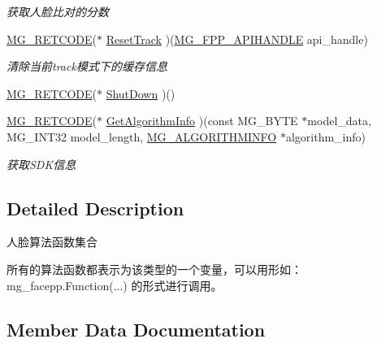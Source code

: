 \begin{DoxyCompactItemize}
\begin{DoxyCompactList}\small\item\em 获取人脸比对的分数 \end{DoxyCompactList}\item 
\hyperlink{_m_g___common_8h_a38fecb61b8c39592ddb51f75d4a5c5e7}{M\+G\+\_\+\+R\+E\+T\+C\+O\+DE}($\ast$ \hyperlink{struct_m_g___f_a_c_e_p_p___a_p_i___f_u_n_c_t_i_o_n_s___t_y_p_e_a53c43385e1f5bcc26e8125a382c2a167}{Reset\+Track} )(\hyperlink{_m_g___facepp_8h_ada15f635ef909e9aca52824dd580da40}{M\+G\+\_\+\+F\+P\+P\+\_\+\+A\+P\+I\+H\+A\+N\+D\+LE} api\+\_\+handle)
\begin{DoxyCompactList}\small\item\em 清除当前track模式下的缓存信息 \end{DoxyCompactList}\item 
\hyperlink{_m_g___common_8h_a38fecb61b8c39592ddb51f75d4a5c5e7}{M\+G\+\_\+\+R\+E\+T\+C\+O\+DE}($\ast$ \hyperlink{struct_m_g___f_a_c_e_p_p___a_p_i___f_u_n_c_t_i_o_n_s___t_y_p_e_a2cebfbb2b3e714afc92d1005f3f13ef9}{Shut\+Down} )()
\item 
\hyperlink{_m_g___common_8h_a38fecb61b8c39592ddb51f75d4a5c5e7}{M\+G\+\_\+\+R\+E\+T\+C\+O\+DE}($\ast$ \hyperlink{struct_m_g___f_a_c_e_p_p___a_p_i___f_u_n_c_t_i_o_n_s___t_y_p_e_a13fb26a5883eef5e0b9d1f4a63741740}{Get\+Algorithm\+Info} )(const M\+G\+\_\+\+B\+Y\+TE $\ast$model\+\_\+data, M\+G\+\_\+\+I\+N\+T32 model\+\_\+length, \hyperlink{struct_m_g___a_l_g_o_r_i_t_h_m_i_n_f_o}{M\+G\+\_\+\+A\+L\+G\+O\+R\+I\+T\+H\+M\+I\+N\+FO} $\ast$algorithm\+\_\+info)
\begin{DoxyCompactList}\small\item\em 获取\+S\+D\+K信息 \end{DoxyCompactList}\end{DoxyCompactItemize}


\subsection{Detailed Description}
人脸算法函数集合 

所有的算法函数都表示为该类型的一个变量，可以用形如： mg\+\_\+facepp.\+Function(...) 的形式进行调用。 

\subsection{Member Data Documentation}
\mbox{\label{struct_m_g___f_a_c_e_p_p___a_p_i___f_u_n_c_t_i_o_n_s___t_y_p_e_ae5b4677b247cb0c7a882b2542491e0d9}} 
